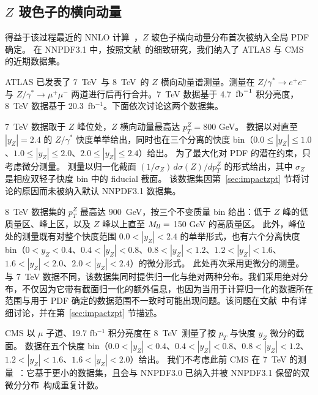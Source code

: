 \subsection{$Z$ 玻色子的横向动量}
\label{sec:zpt}

得益于该过程最近的 NNLO 计算~\cite{Ridder:2015dxa,Ridder:2016nkl,Boughezal:2015ded,Boughezal:2016isb}，$Z$ 玻色子横向动量分布首次被纳入全局 PDF 确定。
在 NNPDF3.1 中，按照文献~\cite{Boughezal:2017nla}的细致研究，我们纳入了 ATLAS 与 CMS 的近期数据集。

%

ATLAS 已发表了 7~TeV~\cite{Aad:2014xaa}与 8~TeV~\cite{Aad:2015auj}的 $Z$
横向动量谱测量。测量在 $Z/\gamma^*\to e^+e^-$ 与 $Z/\gamma^*\to \mu^+\mu^-$ 两道进行后再行合并。7~TeV 数据基于 4.7~${\rm fb}^{-1}$ 积分亮度，8~TeV 数据基于 20.3~fb$^{-1}$。下面依次讨论这两个数据集。

7~TeV 数据取于 $Z$ 峰位处，$Z$ 横向动量最高达 $p_T^Z=800$ GeV。
%
数据以对直至 $|y_Z|=2.4$ 的 $Z/\gamma^*$ 快度单举给出，同时也在三个分离的快度 bin（$0.0\le |y_Z| \le 1.0$、$1.0 \le |y_Z| \le 2.0$、$2.0 \le |y_Z| \le 2.4$）给出。
%
为了最大化对 PDF 的潜在约束，只考虑微分测量。
%
测量以归一化截面 $(1/\sigma_Z)\,d\sigma(Z)/d p_T^Z$ 的形式给出，其中 $\sigma_Z$
是相应双轻子快度 bin 中的 fiducial 截面。
%
该数据集因第~\ref{sec:impactzpt} 节将讨论的原因而未被纳入默认 NNPDF3.1 数据集。

8~TeV 数据集的 $p_T^Z$ 最高达 $900$~GeV，按三个不变质量 bin 给出：低于 $Z$ 峰的低质量区、峰上区，以及 $Z$ 峰以上直至 $M_{ll}=$ 150 GeV 的高质量区。
%
此外，峰位处的测量既有对整个快度范围 $0.0<|y_Z|<2.4$ 的单举形式，也有六个分离快度 bin（$0<y_Z<0.4$、$0.4<|y_Z|<0.8$、$0.8<|y_Z|<1.2$、$1.2<|y_Z|<1.6$、$1.6<|y_Z|<2.0$、$2.0<|y_Z|<2.4$）的微分形式。
%
此处再次采用更微分的测量。
%
与 7~TeV 数据不同，该数据集同时提供归一化与绝对两种分布。我们采用绝对分布，不仅因为它带有截面归一化的额外信息，也因为当用于计算归一化的数据所在范围与用于 PDF 确定的数据范围不一致时可能出现问题。该问题在文献~\cite{Boughezal:2017nla}中有详细讨论，并在第~\ref{sec:impactzpt} 节描述。

CMS 以 $\mu$ 子道、19.7 fb$^{-1}$ 积分亮度在 8~TeV~\cite{Khachatryan:2015oaa}测量了按 $p_T$ 与快度 $y_Z$ 微分的截面。
数据在五个快度 bin（$0.0<|y_Z|<0.4$、$0.4<|y_Z|<0.8$、$0.8<|y_Z|<1.2$、$1.2<|y_Z|<1.6$、$1.6<|y_Z|<2.0$）给出。
%
我们不考虑此前 CMS 在 7~TeV 的测量~\cite{Chatrchyan:2011wt}：它基于更小的数据集，且会与 NNPDF3.0 已纳入并被 NNPDF3.1 保留的双微分分布~\cite{Chatrchyan:2013tia}构成重复计数。


